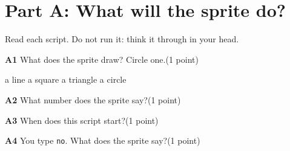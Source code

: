 \documentclass[level=1]{kidscode}
\newcommand{\qnum}[1]{\textbf{\color{kcaccent}#1}\quad}
\newcommand{\pts}[1]{\hfill{\small(#1)}}
\begin{document}
\section{Part A: What will the sprite do?}
Read each script. Do not run it: think it through in your head.

\begin{minipage}[t]{0.42\linewidth}
\begin{scratch}[scale=0.75]
\end{scratch}
\end{minipage}\hfill
\begin{minipage}[t]{0.55\linewidth}
\qnum{A1} What does the sprite draw? Circle one.\pts{1 point}\par\medskip
a line \qquad a square \qquad a triangle \qquad a circle
\end{minipage}

\bigskip{}
\begin{minipage}[t]{0.42\linewidth}
\begin{scratch}[scale=0.75]
\end{scratch}
\end{minipage}\hfill
\begin{minipage}[t]{0.55\linewidth}
\qnum{A2} What number does the sprite say?\pts{1 point}\par
{}
\end{minipage}

\bigskip{}
\begin{minipage}[t]{0.42\linewidth}
\begin{scratch}[scale=0.75]
  {}
  {}
\end{scratch}
\end{minipage}\hfill
\begin{minipage}[t]{0.55\linewidth}
\qnum{A3} When does this script start?\pts{1 point}\par
{}
\qnum{A4} You type \texttt{no}. What does the sprite say?\pts{1 point}\par
{}
\end{minipage}
\end{document}
